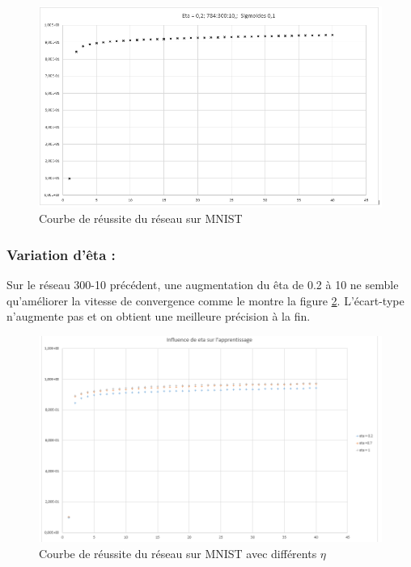 \begin{figure}[h!]
  \includegraphics[width=\linewidth]{fig/MNIST_result_1.png}
  \caption{Courbe de réussite du réseau sur MNIST}
  \label{fig:mnist_result_1}
\end{figure}

\subsubsection*{Variation d’êta :}


Sur le réseau 300-10 précédent, une augmentation du êta de 0.2 à 10 ne semble qu’améliorer la vitesse de convergence comme le montre la figure \ref{fig:mnist_influence_eta}. 
L’écart-type n’augmente pas et on obtient une meilleure précision à la fin.

\begin{figure}[h!]
  \includegraphics[width=\linewidth]{fig/MNIST_influence_eta.png}
  \caption{Courbe de réussite du réseau sur MNIST avec différents $\eta$}
  \label{fig:mnist_influence_eta}
\end{figure}

